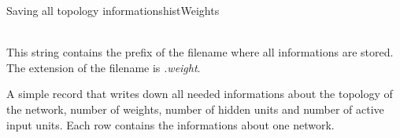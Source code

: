 \begin{moduledoc}{Saving all topology informations}{histWeights}

\item[\KeyWord{historyFile} \Param{filename}]~\\
This string contains the prefix of the filename where all informations are stored.
The extension of the filename is {\it .weight}.
\end{moduledoc}

A simple record that writes down all needed informations about the topology
of the network, number of weights, number of hidden units and number of
active input units. Each row contains the informations about one 
network.
